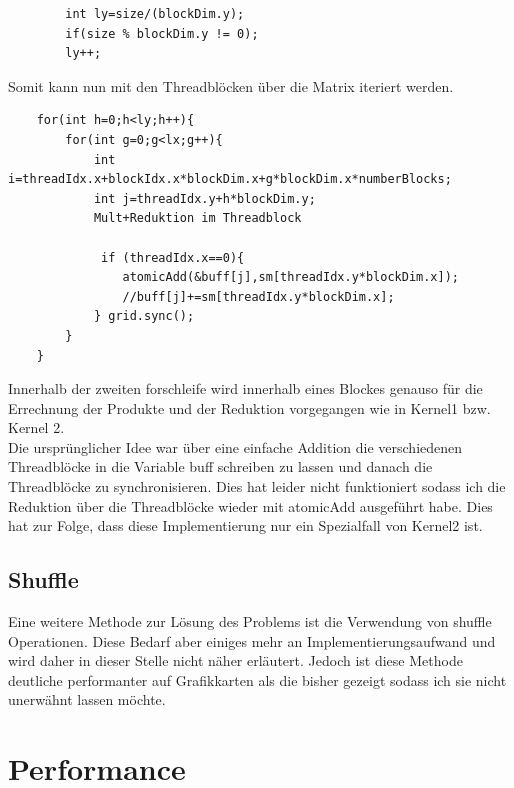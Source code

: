 \documentclass[10pt,a4paper]{article}
\begin{document}
 	\begin{lstlisting}
 		int ly=size/(blockDim.y);
 		if(size % blockDim.y != 0);
 		ly++;        
 	\end{lstlisting}
 	Somit kann nun mit den Threadblöcken über die Matrix iteriert werden.
 	\begin{lstlisting}
 	for(int h=0;h<ly;h++){
 		for(int g=0;g<lx;g++){
 			int i=threadIdx.x+blockIdx.x*blockDim.x+g*blockDim.x*numberBlocks;
 			int j=threadIdx.y+h*blockDim.y;   
 			Mult+Reduktion im Threadblock
 			
 			 if (threadIdx.x==0){
 				atomicAdd(&buff[j],sm[threadIdx.y*blockDim.x]);
 				//buff[j]+=sm[threadIdx.y*blockDim.x];
 			} grid.sync();
 		}
 	}
 	\end{lstlisting}
 	Innerhalb der zweiten forschleife wird innerhalb eines Blockes genauso für die Errechnung der Produkte und der Reduktion vorgegangen wie in Kernel1 bzw. Kernel 2.\\
 	Die ursprünglicher Idee war über eine einfache Addition die verschiedenen Threadblöcke in die Variable buff schreiben zu lassen und danach die Threadblöcke zu synchronisieren. Dies hat leider nicht funktioniert sodass ich die Reduktion über die Threadblöcke wieder mit atomicAdd ausgeführt habe. Dies hat zur Folge, dass diese Implementierung nur ein Spezialfall von Kernel2 ist.
	 \subsection{Shuffle}
	 Eine weitere Methode zur Lösung des Problems ist die Verwendung von shuffle Operationen. Diese Bedarf aber einiges mehr an Implementierungsaufwand und wird daher in dieser Stelle nicht näher erläutert. Jedoch ist diese Methode deutliche performanter auf Grafikkarten als die bisher gezeigt sodass ich sie nicht unerwähnt lassen möchte.

	 \section{Performance}
\end{document}
